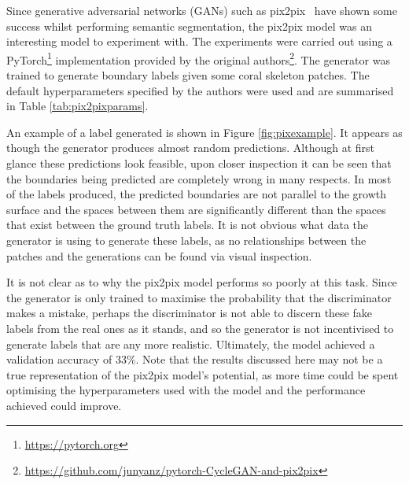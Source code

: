 Since generative adversarial networks (GANs) such as pix2pix~\cite{pix2pix} have shown some success whilst performing semantic segmentation, the pix2pix model was an interesting model to experiment with. The experiments were carried out using a PyTorch\footnote{\url{https://pytorch.org}} implementation provided by the original authors\footnote{\url{https://github.com/junyanz/pytorch-CycleGAN-and-pix2pix}}. The generator was trained to generate boundary labels given some coral skeleton patches. The default hyperparameters specified by the authors were used and are summarised in Table \ref{tab:pix2pixparams}.

An example of a label generated is shown in Figure \ref{fig:pixexample}. It appears as though the generator produces almost random predictions. Although at first glance these predictions look feasible, upon closer inspection it can be seen that the boundaries being predicted are completely wrong in many respects. In most of the labels produced, the predicted boundaries are not parallel to the growth surface and the spaces between them are significantly different than the spaces that exist between the ground truth labels. It is not obvious what data the generator is using to generate these labels, as no relationships between the patches and the generations can be found via visual inspection.

It is not clear as to why the pix2pix model performs so poorly at this task. Since the generator is only trained to maximise the probability that the discriminator makes a mistake, perhaps the discriminator is not able to discern these fake labels from the real ones as it stands, and so the generator is not incentivised to generate labels that are any more realistic. Ultimately, the model achieved a validation accuracy of 33\%. Note that the results discussed here may not be a true representation of the pix2pix model's potential, as more time could be spent optimising the hyperparameters used with the model and the performance achieved could improve.


